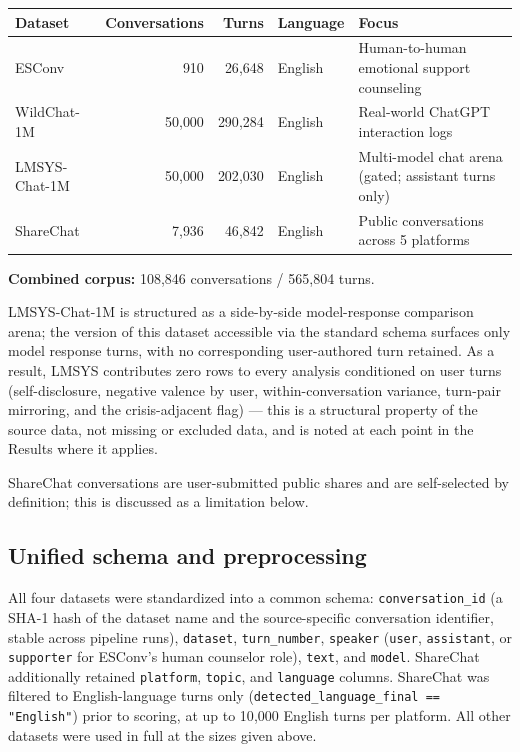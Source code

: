 \documentclass[11pt]{article}
\begin{document}
\begin{center}
\begin{tabular}{lrrll}
\toprule
\textbf{Dataset} & \textbf{Conversations} & \textbf{Turns} & \textbf{Language} & \textbf{Focus} \\
\midrule
ESConv & 910 & 26{,}648 & English & Human-to-human emotional support counseling \\
WildChat-1M & 50{,}000 & 290{,}284 & English & Real-world ChatGPT interaction logs \\
LMSYS-Chat-1M & 50{,}000 & 202{,}030 & English & Multi-model chat arena (gated; assistant turns only) \\
ShareChat & 7{,}936 & 46{,}842 & English & Public conversations across 5 platforms \\
\bottomrule
\end{tabular}
\end{center}

\noindent \textbf{Combined corpus:} 108{,}846 conversations / 565{,}804 turns.

LMSYS-Chat-1M is structured as a side-by-side model-response comparison arena; the version of this dataset accessible via the standard schema surfaces only model response turns, with no corresponding user-authored turn retained. As a result, LMSYS contributes zero rows to every analysis conditioned on user turns (self-disclosure, negative valence by user, within-conversation variance, turn-pair mirroring, and the crisis-adjacent flag) --- this is a structural property of the source data, not missing or excluded data, and is noted at each point in the Results where it applies.

ShareChat conversations are user-submitted public shares and are self-selected by definition; this is discussed as a limitation below.

\subsection{Unified schema and preprocessing}

All four datasets were standardized into a common schema: \texttt{conversation\_id} (a SHA-1 hash of the dataset name and the source-specific conversation identifier, stable across pipeline runs), \texttt{dataset}, \texttt{turn\_number}, \texttt{speaker} (\texttt{user}, \texttt{assistant}, or \texttt{supporter} for ESConv's human counselor role), \texttt{text}, and \texttt{model}. ShareChat additionally retained \texttt{platform}, \texttt{topic}, and \texttt{language} columns. ShareChat was filtered to English-language turns only (\texttt{detected\_language\_final == "English"}) prior to scoring, at up to 10{,}000 English turns per platform. All other datasets were used in full at the sizes given above.
\end{document}
